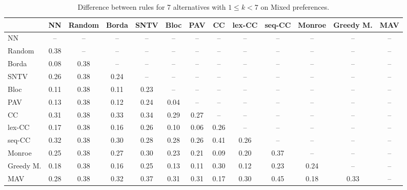 
\begin{table*}[h!]
\centering
\begin{tabular}{lcccccccccccc}
\toprule
 & NN & Random & Borda & SNTV & Bloc & PAV & CC & lex-CC & seq-CC & Monroe & Greedy M. & MAV \\
\midrule
NN & -- & -- & -- & -- & -- & -- & -- & -- & -- & -- & -- & -- \\
Random & 0.38 & -- & -- & -- & -- & -- & -- & -- & -- & -- & -- & -- \\
Borda & 0.08 & 0.38 & -- & -- & -- & -- & -- & -- & -- & -- & -- & -- \\
SNTV & 0.26 & 0.38 & 0.24 & -- & -- & -- & -- & -- & -- & -- & -- & -- \\
Bloc & 0.11 & 0.38 & 0.11 & 0.23 & -- & -- & -- & -- & -- & -- & -- & -- \\
PAV & 0.13 & 0.38 & 0.12 & 0.24 & 0.04 & -- & -- & -- & -- & -- & -- & -- \\
CC & 0.31 & 0.38 & 0.33 & 0.34 & 0.29 & 0.27 & -- & -- & -- & -- & -- & -- \\
lex-CC & 0.17 & 0.38 & 0.16 & 0.26 & 0.10 & 0.06 & 0.26 & -- & -- & -- & -- & -- \\
seq-CC & 0.32 & 0.38 & 0.30 & 0.28 & 0.28 & 0.26 & 0.41 & 0.26 & -- & -- & -- & -- \\
Monroe & 0.25 & 0.38 & 0.27 & 0.30 & 0.23 & 0.21 & 0.09 & 0.20 & 0.37 & -- & -- & -- \\
Greedy M. & 0.18 & 0.38 & 0.16 & 0.25 & 0.13 & 0.11 & 0.30 & 0.12 & 0.23 & 0.24 & -- & -- \\
MAV & 0.28 & 0.38 & 0.32 & 0.37 & 0.31 & 0.31 & 0.17 & 0.30 & 0.45 & 0.18 & 0.33 & -- \\
\bottomrule
\end{tabular}

\caption{Difference between rules for 7 alternatives with $1 \leq k < 7$ on Mixed preferences.}
\end{table*}
